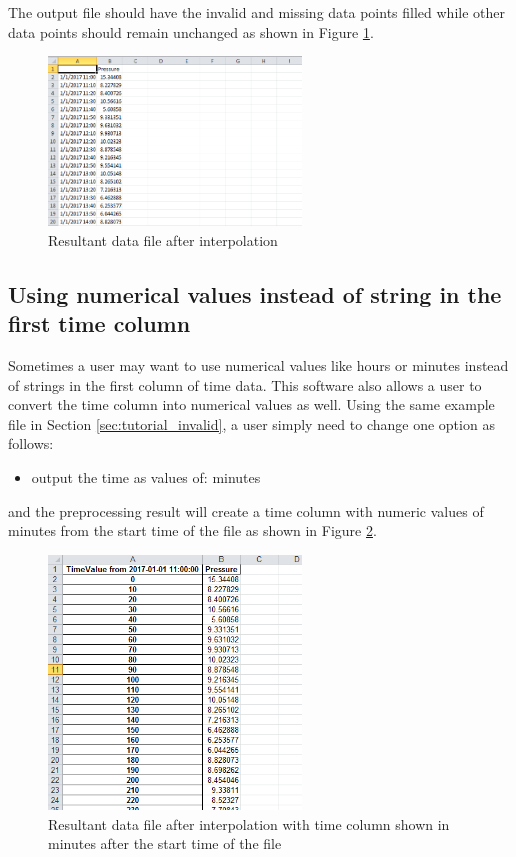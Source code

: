 \documentclass[12pt,a4paper]{article}
\begin{document}
The output file should have the invalid and missing data points filled while other data points should remain unchanged as shown in Figure \ref{fig:missing_data_result}.

\begin{figure}[H]
\centering
\includegraphics[width=0.6\textwidth]{missing_data_result.png}
\caption{Resultant data file after interpolation}
\label{fig:missing_data_result}
\end{figure}

\subsection{Using numerical values instead of string in the first time column}
Sometimes a user may want to use numerical values like hours or minutes instead of strings in the first column of time data.
This software also allows a user to convert the time column into numerical values as well.
Using the same example file in Section \ref{sec:tutorial_invalid}, a user simply need to change one option as follows:
\begin{itemize}
\item output the time as values of: minutes
\end{itemize}

and the preprocessing result will create a time column with numeric values of minutes from the start time of the file as shown in Figure \ref{fig:minute_data}.

\begin{figure}[H]
\centering
\includegraphics[width=0.6\textwidth]{missing_data_result_minute.png}
\caption{Resultant data file after interpolation with time column shown in minutes after the start time of the file}
\label{fig:minute_data}
\end{figure}
\end{document}
